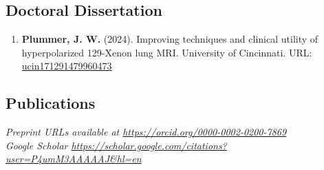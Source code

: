 \documentclass[12pt,]{scrartcl}
\begin{document}
\subsection{Doctoral Dissertation}\label{dissertation}
\begin{enumerate}
    \leftskip-0.13in
    \item \textbf{Plummer, J. W.} (2024). Improving techniques and clinical utility of hyperpolarized 129-Xenon lung MRI. University of Cincinnati. URL: \href{http://rave.ohiolink.edu/etdc/view?acc_num=ucin171291479960473}{ucin171291479960473}
    
\end{enumerate}
\subsection{Publications}\label{publications}

\emph{Preprint URLs available at
\url{https://orcid.org/0000-0002-0200-7869}}\\
\emph{Google Scholar \url{https://scholar.google.com/citations?user=P4umM3AAAAAJ&hl=en}}
\end{document}

